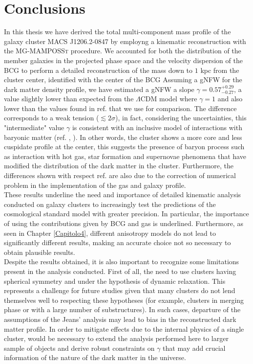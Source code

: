 \chapter{Conclusions}

In this thesis we have derived the total multi-component mass profile of the galaxy cluster MACS J1206.2-0847 by employng a kinematic reconstruction with the \textsc{MG-MAMPOSSt} procedure. We accounted for both the distribution of the member galaxies in the projected phase space and the velocity dispersion of the BCG to perform a detailed reconstruction of the mass down to $1$ kpc from the cluster center, identified with the center of the BCG Assuming a gNFW for the dark matter density profile, we have estimated  a gNFW a slope $\gamma = 0.57^{+0.29} _{-0.27}$, a value slightly lower than expected from the $\Lambda$CDM model where $\gamma = 1$ and also lower than the values found in ref. \cite{CLASH-VLT:-The-Inner-Slope-of-the-MACS-J1206.2-0847-Dark-Matter-Density-Profile} that we use for comparison. The difference corresponds to a weak tension ($\lesssim 2 \sigma$), in fact, considering the uncertainties, this "intermediate" value $\gamma$ is consistent with an inclusive model of interactions with baryonic matter (ref. \cite{Newman_2013}, \cite{Cusp-Core-Problem-Del-Popolo}). In other words, the cluster shows a more core and less cuspidate profile at the center, this suggests the presence of baryon process such as interaction with hot gas, star formation and supernovae phenomena that have modified the distribution of the dark matter in the cluster. Furthermore, the differences shown with respect ref. \cite{CLASH-VLT:-The-Inner-Slope-of-the-MACS-J1206.2-0847-Dark-Matter-Density-Profile} are also due to the correction of numerical problem in the implementation of the gas and galaxy profile. \\These results underline the need and importance of detailed kinematic analysis conducted on galaxy clusters to increasingly test the predictions of the cosmological standard model with greater precision. In particular, the importance of using the contributions given by BCG and gas is underlined. Furthermore, as seen in Chapter \ref{Capitolo4}, different anisotropy models do not lead to significantly different results, making an accurate choice not so necessary to obtain plausible results.\\
Despite the results obtained, it is also important to recognize some limitations present in the analysis conducted. First of all, the need to use clusters having spherical symmetry and under the hypothesis of dynamic relaxation. This represents a challenge for future studies given that many clusters do not lend themselves well to respecting these hypotheses (for example, clusters in merging phase or with a large number of substructures). In such cases, departure of the assumptions of the Jeans' analysis may lead to bias in the reconstructed dark matter profile. In order to mitigate effects due to the internal physics of a single cluster, would be necessary to extend the analysis performed here to larger sample of objects and derive robust constraints on $\gamma$ that may add crucial information of the nature of the dark matter in the universe.
